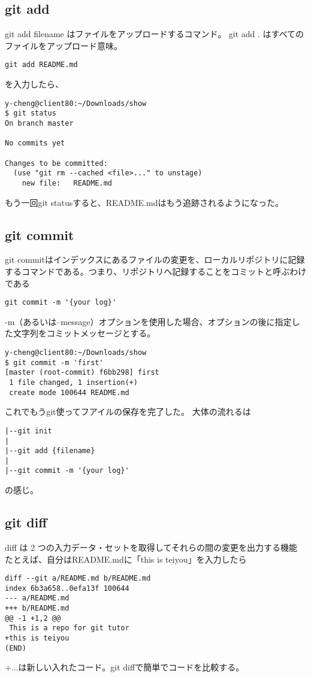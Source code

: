 \documentclass{article}
\begin{document}
\subsection{git add}
git add {filename} はファイルをアップロードするコマンド。
git add . はすべてのファイルをアップロード意味。
\begin{lstlisting}
git add README.md
\end{lstlisting}
を入力したら、
\begin{lstlisting}
y-cheng@client80:~/Downloads/show  
$ git status
On branch master

No commits yet

Changes to be committed:
  (use "git rm --cached <file>..." to unstage)
	new file:   README.md
\end{lstlisting}
もう一回git statusすると、README.mdはもう追跡されるようになった。
\subsection{git commit}
git commitはインデックスにあるファイルの変更を、ローカルリポジトリに記録するコマンドである。つまり、リポジトリへ記録することをコミットと呼ぶわけである
\begin{lstlisting}
git commit -m '{your log}'
\end{lstlisting}
-m（あるいは--message）オプションを使用した場合、オプションの後に指定した文字列をコミットメッセージとする。
\begin{lstlisting}
y-cheng@client80:~/Downloads/show 
$ git commit -m 'first'
[master (root-commit) f6bb298] first
 1 file changed, 1 insertion(+)
 create mode 100644 README.md
\end{lstlisting}
これでもうgit使ってフアイルの保存を完了した。
大体の流れるは
\begin{lstlisting}
|--git init
|
|--git add {filename}
|
|--git commit -m '{your log}'
\end{lstlisting}
の感じ。
\subsection{git diff}
diff は 2 つの入力データ・セットを取得してそれらの間の変更を出力する機能
たとえば、自分はREADME.mdに「this is teiyou」を入力したら
\begin{lstlisting}
diff --git a/README.md b/README.md
index 6b3a658..0efa13f 100644
--- a/README.md
+++ b/README.md
@@ -1 +1,2 @@
 This is a repo for git tutor
+this is teiyou
(END)
\end{lstlisting}
+{...}は新しい入れたコード。git diffで簡単でコードを比較する。
\end{document}
